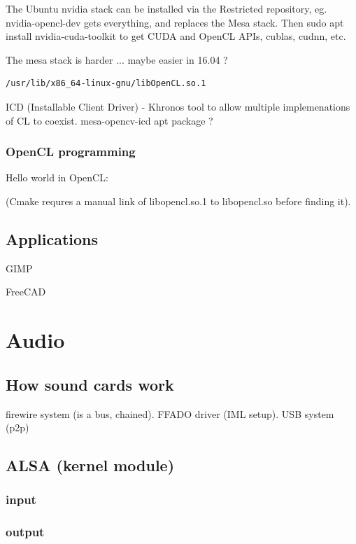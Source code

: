 \documentclass[oneside,english]{scrbook}
\begin{document}
The Ubuntu nvidia stack can be installed via the Restricted repository, eg. nvidia-opencl-dev gets everything, and replaces the Mesa stack.  Then sudo apt install nvidia-cuda-toolkit to get CUDA and OpenCL APIs, cublas, cudnn, etc.

The mesa stack is harder ...  maybe easier in 16.04 ?
\begin{lstlisting}
/usr/lib/x86_64-linux-gnu/libOpenCL.so.1
\end{lstlisting}
ICD (Installable Client Driver) - Khronos tool to allow multiple implemenations of CL to coexist.
mesa-opencv-icd  apt package ?


\section{OpenCL programming}

Hello world in OpenCL:



(Cmake requres a manual link of libopencl.so.1 to libopencl.so before finding it).

\chapter{Applications}

GIMP

FreeCAD


\part{Audio}


\chapter{How sound cards work}

firewire system (is a bus, chained). FFADO driver (IML setup).
USB system (p2p)


\chapter{ALSA (kernel module)}


\section{input}


\section{output}
\end{document}
